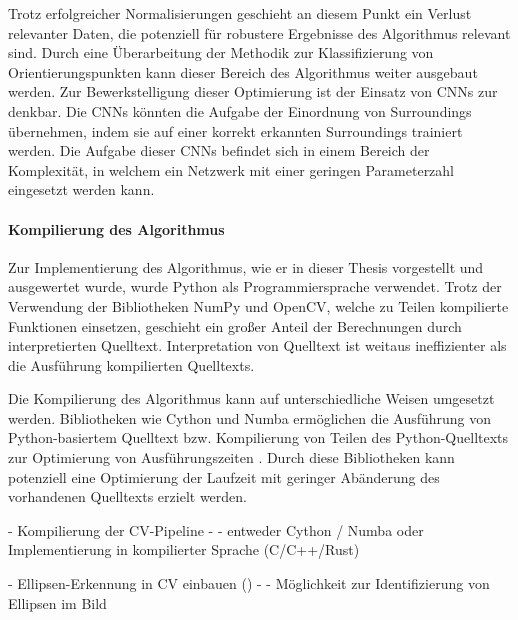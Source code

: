 Trotz erfolgreicher Normalisierungen geschieht an diesem Punkt ein Verlust relevanter Daten, die potenziell für robustere Ergebnisse des Algorithmus relevant sind. Durch eine Überarbeitung der Methodik zur Klassifizierung von Orientierungspunkten kann dieser Bereich des Algorithmus weiter ausgebaut werden. Zur Bewerkstelligung dieser Optimierung ist der Einsatz von CNNs zur denkbar. Die CNNs könnten die Aufgabe der Einordnung von Surroundings übernehmen, indem sie auf einer korrekt erkannten Surroundings trainiert werden. Die Aufgabe dieser CNNs befindet sich in einem Bereich der Komplexität, in welchem ein Netzwerk mit einer geringen Parameterzahl eingesetzt werden kann.


\paragraph{Kompilierung des Algorithmus}

Zur Implementierung des Algorithmus, wie er in dieser Thesis vorgestellt und ausgewertet wurde, wurde Python als Programmiersprache verwendet. Trotz der Verwendung der Bibliotheken NumPy und OpenCV, welche zu Teilen kompilierte Funktionen einsetzen, geschieht ein großer Anteil der Berechnungen durch interpretierten Quelltext. Interpretation von Quelltext ist weitaus ineffizienter als die Ausführung kompilierten Quelltexts.

Die Kompilierung des Algorithmus kann auf unterschiedliche Weisen umgesetzt werden. Bibliotheken wie Cython und Numba ermöglichen die Ausführung von Python-basiertem Quelltext bzw. Kompilierung von Teilen des Python-Quelltexts zur Optimierung von Ausführungszeiten \cite{cython,numba}. Durch diese Bibliotheken kann potenziell eine Optimierung der Laufzeit mit geringer Abänderung des vorhandenen Quelltexts erzielt werden.

- Kompilierung der CV-Pipeline
- - entweder Cython \cite{cython} / Numba \cite{numba} oder Implementierung in kompilierter Sprache (C/C++/Rust)

- Ellipsen-Erkennung in CV einbauen (\cite{ellipse_detection_algorithm})
- - Möglichkeit zur Identifizierung von Ellipsen im Bild

